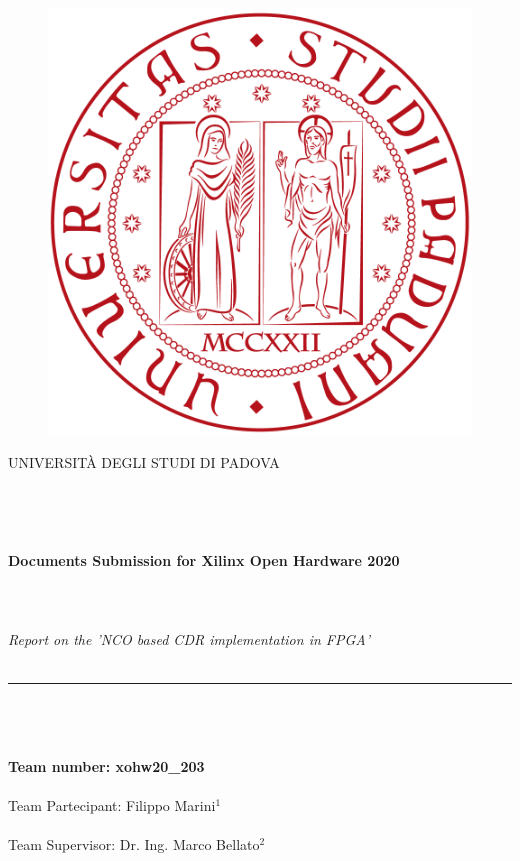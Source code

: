 \documentclass[11pt]{article}
\renewcommand{\>}{\rangle} \renewcommand{\emptyset}{\varnothing}
\begin{document}
\begin{figure}[]
\end{figure}

\begin{figure}[]
  \centering \vspace{1cm}
  {\includegraphics[width=.15\textwidth]{images/Padova.png}}
\end{figure}
\begin{center}
  {\large{U}\normalsize{NIVERSITÀ DEGLI}\large{ S}\normalsize{TUDI DI}\large{ P}\normalsize{ADOVA}}\\
  \textit{ }\\
  \textit{ }\\
  \textit{ }\\
  \textit{ }\\
  \textbf{\large{Documents Submission for Xilinx Open Hardware 2020}}\\
  \textit{ }\\
  \textit{ }\\
  \textit{ }\\
  \textit{\Large{Report on the 'NCO based CDR implementation in FPGA'}} \\
  \textit{ }\\
  \noindent\rule{16cm}{0.4pt}
  \textit{ }\\
  \textit{ }\\
  \textit{ }\\
  \textbf{Team number: xohw20\_203}\\
  \textit{ }\\
  Team Partecipant: Filippo Marini$^1$\\
  \textit{ }\\
  Team Supervisor: Dr. Ing. Marco Bellato$^2$\\
  \textit{ }\\
\end{center}
\end{document}
